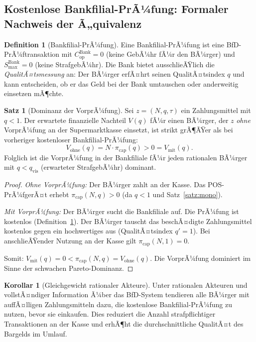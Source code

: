 ﻿\documentclass[a4paper,12pt]{article}
\theoremstyle{definition}
\newtheorem{definition}{Definition}
\newtheorem{satz}{Satz}
\newtheorem{korollar}{Korollar}
\begin{document}
\subsection{Kostenlose Bankfilial-PrÃ¼fung: Formaler Nachweis der Ã„quivalenz}

\begin{definition}[Bankfilial-PrÃ¼fung]
\label{def:bank}
Eine Bankfilial-PrÃ¼fung ist eine BfD-PrÃ¼ftransaktion mit $C_{\text{op}}^{\text{Bank}} = 0$
(keine GebÃ¼hr fÃ¼r den BÃ¼rger) und $S_{\max}^{\text{Bank}} = 0$ (keine StrafgebÃ¼hr).
Die Bank bietet ausschlieÃŸlich die \emph{QualitÃ¤tsmessung} an:
Der BÃ¼rger erfÃ¤hrt seinen QualitÃ¤tsindex $q$ und kann entscheiden,
ob er das Geld bei der Bank umtauschen oder anderweitig einsetzen mÃ¶chte.
\end{definition}

\begin{satz}[Dominanz der VorprÃ¼fung]
\label{satz:vorpruef}
Sei $z = (N, q, \tau)$ ein Zahlungsmittel mit $q < 1$.
Der erwartete finanzielle Nachteil $V(q)$ fÃ¼r einen BÃ¼rger, der
$z$ \emph{ohne} VorprÃ¼fung an der Supermarktkasse einsetzt,
ist strikt grÃ¶ÃŸer als bei vorheriger kostenloser Bankfilial-PrÃ¼fung:
\[
V_{\text{ohne}}(q) = N \cdot \pi_{\text{cap}}(q) > 0 = V_{\text{mit}}(q).
\]
Folglich ist die VorprÃ¼fung in der Bankfiliale fÃ¼r jeden rationalen BÃ¼rger
mit $q < q_{\text{vis}}$ (erwarteter StrafgebÃ¼hr) dominant.
\end{satz}

\begin{proof}
\emph{Ohne VorprÃ¼fung:}
Der BÃ¼rger zahlt an der Kasse.  Das POS-PrÃ¼fgerÃ¤t erhebt $\pi_{\text{cap}}(N,q) > 0$
(da $q < 1$ und Satz~\ref{satz:mono}).

\emph{Mit VorprÃ¼fung:}
Der BÃ¼rger sucht die Bankfiliale auf.  Die PrÃ¼fung ist kostenlos
(Definition~\ref{def:bank}).  Der BÃ¼rger tauscht das beschÃ¤digte Zahlungsmittel
kostenlos gegen ein hochwertiges aus (QualitÃ¤tsindex $q' = 1$).
Bei anschlieÃŸender Nutzung an der Kasse gilt $\pi_{\text{cap}}(N, 1) = 0$.

Somit: $V_{\text{mit}}(q) = 0 < \pi_{\text{cap}}(N,q) = V_{\text{ohne}}(q)$.
Die VorprÃ¼fung dominiert im Sinne der schwachen Pareto-Dominanz.
\end{proof}

\begin{korollar}[Gleichgewicht rationaler Akteure]
\label{kor:gleichgewicht}
Unter rationalen Akteuren und vollstÃ¤ndiger Information Ã¼ber das BfD-System
tendieren alle BÃ¼rger mit auffÃ¤lligen Zahlungsmitteln dazu,
die kostenlose Bankfilial-PrÃ¼fung zu nutzen, bevor sie einkaufen.
Dies reduziert die Anzahl strafpflichtiger Transaktionen an der Kasse
und erhÃ¶ht die durchschnittliche QualitÃ¤t des Bargelds im Umlauf.
\end{korollar}
\end{document}
